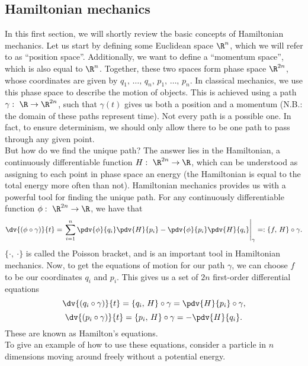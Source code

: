 \documentclass{article}
\begin{document}
\begin{multicols}{2}
	\section{Hamiltonian mechanics}
	In this first section, we will shortly review the basic concepts of Hamiltonian mechanics. Let us start by defining some Euclidean space \(\R^n\), which we will refer to as ``position space''. Additionally, we want to define a ``momentum space'', which is also equal to \(\R^n\).
	Together, these two spaces form phase space \(\R^{2n}\), whose coordinates are given by \(q_1,\,\dots,\,q_n,\,p_1,\,\dots,\,p_n\). In classical mechanics, we use this phase space to describe the motion of objects. This is achieved using a path \(\gamma:\ \R\to\R^{2n}\), such that \(\gamma(t)\) gives us both a position and a momentum (N.B.: the domain of these paths represent time).
	Not every path is a possible one. In fact, to ensure determinism, we should only allow there to be one path to pass through any given point.\\
	But how do we find the unique path? The answer lies in the Hamiltonian, a continuously differentiable function \(H:\ \R^{2n}\to\R\), which can be understood as assigning to each point in phase space an energy (the Hamiltonian is equal to the total energy more often than not).
	Hamiltonian mechanics provides us with a powerful tool for finding the unique path. For any continuously differentiable function \(\phi:\ \R^{2n}\to\R\), we have that
	\begin{equation}
		\dv{(\phi\circ\gamma)}{t} = \left.\sum_{i=1}^n \pdv{\phi}{q_i}\pdv{H}{p_i} - \pdv{\phi}{p_i}\pdv{H}{q_i}\right|_{\gamma} =: \{f,\,H\}\circ\gamma.
	\end{equation}
	\(\{\cdot,\ \cdot\}\) is called the Poisson bracket, and is an important tool in Hamiltonian mechanics.
	Now, to get the equations of motion for our path \(\gamma\), we can choose \(f\) to be our coordinates \(q_i\) and \(p_i\). This gives us a set of \(2n\) first-order differential equations
	\begin{equation}
		\dv{(q_i\circ\gamma)}{t} = \{q_i,\,H\}\circ\gamma = \pdv{H}{p_i}\circ\gamma,
	\end{equation}
	\begin{equation}
		\dv{(p_i\circ\gamma)}{t} = \{p_i,\,H\}\circ\gamma = -\pdv{H}{q_i}.
	\end{equation}
	These are known as Hamilton's equations.\\
	To give an example of how to use these equations, consider a particle in \(n\) dimensions moving around freely without a potential energy.

\end{multicols}
\end{document}
